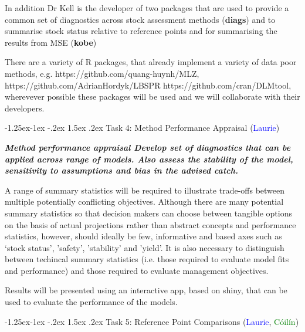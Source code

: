 \documentclass[a4paper, 10pt]{article}
\makeatletter
\newcommand{\laurie}{\textcolor{blue}}
\newcommand{\coilin}{\textcolor{green}}
\renewcommand{\subsubsection}{\@startsection{subsubsection}{3}{\z@}%
  {-1.25ex\@plus -1ex \@minus -.2ex}%
  {1.5ex \@plus .2ex}%
  {\normalfont\slshape}}
\makeatother
\begin{document}
In addition Dr Kell is the developer of two packages that are used to provide a common set of diagnostics across stock assessment methods (\textbf{diags}) and to summarise stock status relative to reference points and for summarising the results from MSE (\textbf{kobe})

There are a variety of R packages, that already implement a variety of data poor methods, e.g. https://github.com/quang-huynh/MLZ, https://github.com/AdrianHordyk/LBSPR  https://github.com/cran/DLMtool, wherevever possible these packages will be used and we will collaborate with their developers.


\subsubsection{Task 4: Method Performance Appraisal (\laurie{Laurie})}

\textit{\textbf{Method performance appraisal Develop set of diagnostics that can be applied across range of models. Also assess the stability of the model, sensitivity to assumptions and bias in the advised catch.}}

A range of summary statistics will be required to illustrate trade-offs between multiple potentially conflicting objectives. Although there are many potential summary statistics so that decision makers can choose between tangible options on the basis of actual projections rather than abstract concepts and performance statistics, however,  should ideally be few, informative and based axes such as  ‘stock status’, 'safety', 'stability' and 'yield'. It is also necessary to distinguish between techincal summary statistics (i.e. those required to evaluate model fits and performance) and those required to evaluate management objectives.

Results will be presented using an interactive app, based on shiny, that can be used to evaluate the performance of the models.


\subsubsection{Task 5: Reference Point Comparisons (\laurie{Laurie}, \coilin{C\'oil\'in})}
\end{document}
